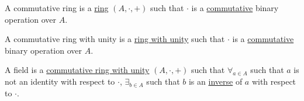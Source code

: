             \begin{definition}
                \label{Definition:MathEnc:Analysis:Sum:ComRing}
                A commutative ring is a
                \hyperref[Definition:MathEnc:Analysis:Sum:Ring]{ring}
                $(A,\cdot,+)$ such that $\cdot$ is a
                \hyperref[%
                    Definition:MathEnc:%
                    Analysis:Sum:CommunativeOperation%
                ]{commutative}
                binary operation over $A$.
            \end{definition}
            \begin{definition}
                \label{Definition:MathEnc:Analysis:Sum:ComRingUnit}
                A commutative ring with unity is a 
                \hyperref[%
                    Definition:MathEnc:%
                    Analysis:Sum:RingUnit%
                ]{ring with unity}
                such that $\cdot$ is a
                \hyperref[%
                    Definition:MathEnc:%
                    Analysis:Sum:CommunativeOperation%
                ]{commutative}
                binary operation over $A$.
            \end{definition}
            \begin{definition}
                \label{Definition:MathEnc:Analysis:Sum:Field}
                A field is a 
                \hyperref[%
                    Definition:MathEnc:%
                    Analysis:Sum:ComRingUnit%
                ]{commutative ring with unity}
                $(A,\cdot,+)$ such that $\forall_{a\in A}$
                such that $a$ is not an identity with respect
                to $\cdot$, $\exists_{b\in A}$ such that $b$ is an
                \hyperref[%
                    Definition:MathEnc:Analysis:%
                    Sum:Inverse%
                ]{inverse} of $a$ with respect to $\cdot$.
            \end{definition}
